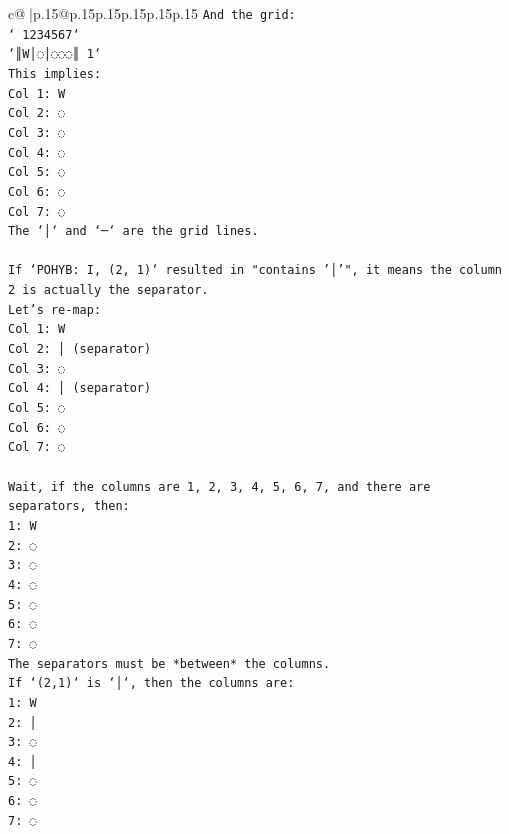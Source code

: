 \documentclass{article}
\begin{document}
{\begin{supertabular}{c@{$\;$}|p{.15\linewidth}@{}p{.15\linewidth}p{.15\linewidth}p{.15\linewidth}p{.15\linewidth}p{.15\linewidth}}
{{{\texttt{And the grid:} \\
\texttt{` 1234567`} \\
\texttt{`║W│◌│◌◌◌║ 1`} \\
\texttt{This implies:} \\
\texttt{Col 1: W} \\
\texttt{Col 2: ◌} \\
\texttt{Col 3: ◌} \\
\texttt{Col 4: ◌} \\
\texttt{Col 5: ◌} \\
\texttt{Col 6: ◌} \\
\texttt{Col 7: ◌} \\
\texttt{The `│` and `─` are the grid lines.} \\
\\ 
\texttt{If `POHYB: I, (2, 1)` resulted in "contains '│'", it means the column 2 is actually the separator.} \\
\texttt{Let's re{-}map:} \\
\texttt{Col 1: W} \\
\texttt{Col 2: │ (separator)} \\
\texttt{Col 3: ◌} \\
\texttt{Col 4: │ (separator)} \\
\texttt{Col 5: ◌} \\
\texttt{Col 6: ◌} \\
\texttt{Col 7: ◌} \\
\\ 
\texttt{Wait, if the columns are 1, 2, 3, 4, 5, 6, 7, and there are separators, then:} \\
\texttt{1: W} \\
\texttt{2: ◌} \\
\texttt{3: ◌} \\
\texttt{4: ◌} \\
\texttt{5: ◌} \\
\texttt{6: ◌} \\
\texttt{7: ◌} \\
\texttt{The separators must be *between* the columns.} \\
\texttt{If `(2,1)` is `│`, then the columns are:} \\
\texttt{1: W} \\
\texttt{2: │} \\
\texttt{3: ◌} \\
\texttt{4: │} \\
\texttt{5: ◌} \\
\texttt{6: ◌} \\
\texttt{7: ◌} \\
}}}
\end{supertabular}}
\end{document}
